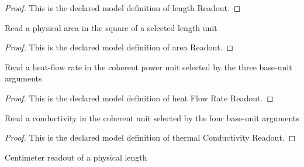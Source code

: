 \begin{proof}
  This is the declared model definition of length Readout.
\end{proof}
\begin{definition}
  \label{def:physics:phyx-mini-0467:phyxminiproblems-problemphyxmini0467-areareadout}
  Read a physical area in the square of a selected length unit
\end{definition}
\begin{proof}
  This is the declared model definition of area Readout.
\end{proof}
\begin{definition}
  \label{def:physics:phyx-mini-0467:phyxminiproblems-problemphyxmini0467-heatflowratereadout}
  Read a heat-flow rate in the coherent power unit selected by the three base-unit arguments
\end{definition}
\begin{proof}
  This is the declared model definition of heat Flow Rate Readout.
\end{proof}
\begin{definition}
  \label{def:physics:phyx-mini-0467:phyxminiproblems-problemphyxmini0467-thermalconductivityreadout}
  Read a conductivity in the coherent unit selected by the four base-unit arguments
\end{definition}
\begin{proof}
  This is the declared model definition of thermal Conductivity Readout.
\end{proof}
\begin{definition}
  \label{def:physics:phyx-mini-0467:phyxminiproblems-problemphyxmini0467-lengthincentimeters}
  Centimeter readout of a physical length
\end{definition}

